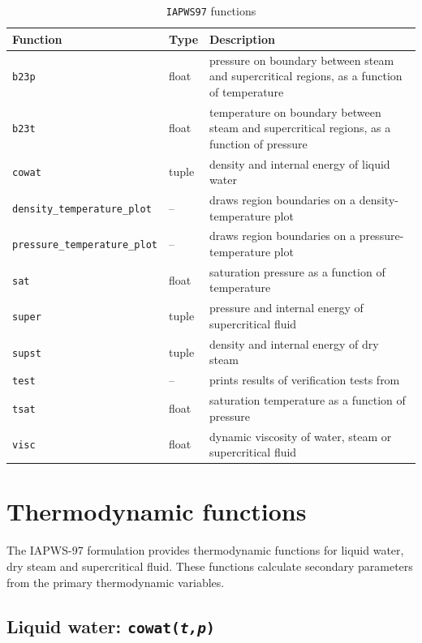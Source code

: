 \begin{table}
  \begin{center}
    \begin{tabular}{|l|l|p{65mm}|}
      \hline
      \textbf{Function} & \textbf{Type} & \textbf{Description}\\
      \hline
      \texttt{b23p} & float & pressure on boundary between steam and supercritical regions, as a function of temperature\\
      \texttt{b23t} & float & temperature on boundary between steam and supercritical regions, as a function of pressure\\
      \texttt{cowat} & tuple & density and internal energy of liquid water\\
      \texttt{density\_temperature\_plot} & -- & draws region boundaries on a density-temperature plot\\
      \texttt{pressure\_temperature\_plot} & -- & draws region boundaries on a pressure-temperature plot\\
      \texttt{sat} & float & saturation pressure as a function of temperature\\
      \texttt{super} & tuple & pressure and internal energy of supercritical fluid\\
      \texttt{supst} & tuple & density and internal energy of dry steam\\
      \texttt{test} & -- & prints results of verification tests from \cite{iapws_2000}\\
      \texttt{tsat} & float & saturation temperature as a function of pressure\\
      \texttt{visc} & float & dynamic viscosity of water, steam or supercritical fluid\\
      \hline
    \end{tabular}
    \caption{\texttt{IAPWS97} functions}
    \label{tb:iapws97_functions}
  \end{center}
\end{table}

\section{Thermodynamic functions}

The IAPWS-97 formulation provides thermodynamic functions for liquid water, dry steam and supercritical fluid.  These functions calculate secondary parameters from the primary thermodynamic variables.

\subsection{Liquid water: \texttt{cowat(\emph{t,p})}}

